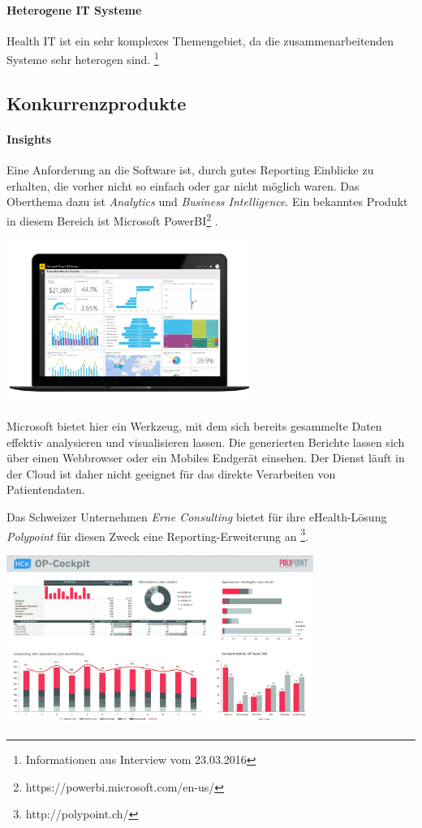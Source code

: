 \documentclass[a4paper]{scrreprt}
\begin{document}
\paragraph{Heterogene IT Systeme} Health IT ist ein sehr komplexes Themengebiet, da die zusammenarbeitenden Systeme sehr heterogen sind. \footnote{Informationen aus Interview vom 23.03.2016}



\subsection{Konkurrenzprodukte}
\paragraph{Insights} Eine Anforderung an die Software ist, durch gutes Reporting Einblicke zu erhalten, die vorher nicht so einfach oder gar nicht möglich waren. Das Oberthema dazu ist \textit{Analytics} und \textit{Business Intelligence}. Ein bekanntes Produkt in diesem Bereich ist Microsoft PowerBI\footnote{https://powerbi.microsoft.com/en-us/} .

\includegraphics[width=0.6\textwidth]{img/research_ms-powerbi.png}

Microsoft bietet hier ein Werkzeug, mit dem sich bereits gesammelte Daten effektiv analysieren und visualisieren lassen. Die generierten Berichte lassen sich über einen Webbrowser oder ein Mobiles Endgerät einsehen. Der Dienst läuft in der Cloud ist daher nicht geeignet für das direkte Verarbeiten von Patientendaten.

\bigskip

Das Schweizer Unternehmen \textit{Erne Consulting} bietet für ihre eHealth-Lösung \textit{Polypoint} für diesen Zweck eine Reporting-Erweiterung an \footnote{http://polypoint.ch/}.

\includegraphics[width=0.75\textwidth]{img/research_polypoint_op-cockpit.jpg}
\end{document}
